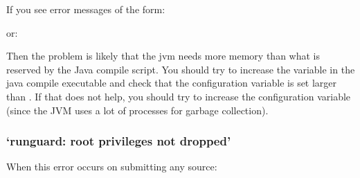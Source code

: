 \documentclass[a4paper,10pt,english,openany]{sphinxmanual}
\begin{document}
\sphinxAtStartPar
If you see error messages of the form:

\begin{sphinxVerbatim}[commandchars=\\\{\}]
     
      
\end{sphinxVerbatim}

\sphinxAtStartPar
or:

\begin{sphinxVerbatim}[commandchars=\\\{\}]
     
       
\end{sphinxVerbatim}

\sphinxAtStartPar
Then the problem is likely that the jvm needs more memory than what is
reserved by the Java compile script. You should try to increase the
 variable in the java compile executable and check that
the configuration variable  is set larger than
. If that does not help, you should try to increase the
configuration variable  (since the JVM uses a lot of
processes for garbage collection).


\subsubsection{‘runguard: root privileges not dropped’}
\label{\detokenize{judging:runguard-root-privileges-not-dropped}}
\sphinxAtStartPar
When this error occurs on submitting any source:

\begin{sphinxVerbatim}[commandchars=\\\{\}]
      
    
\end{sphinxVerbatim}
\end{document}
